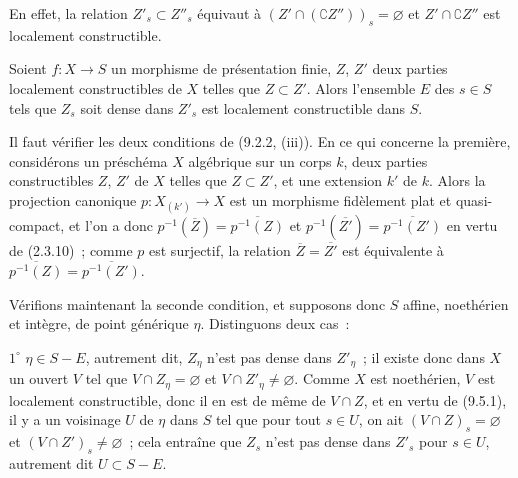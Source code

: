 En effet, la relation $Z'_s\subset Z''_s$ équivaut à
$(Z'\cap(\complement Z''))_s=\varnothing$ et
$Z'\cap\complement Z''$ est localement constructible.

\begin{proposition}[9.5.3]
\label{IV.9.5.3-fr}
Soient $f:X\to S$ un morphisme de présentation finie, $Z$, $Z'$ deux parties
localement constructibles de $X$ telles que $Z\subset Z'$. Alors l'ensemble
$E$ des $s\in S$ tels que $Z_s$ soit dense dans $Z'_s$ est localement
constructible dans $S$.
\end{proposition}

Il faut vérifier les deux conditions de (9.2.2, (iii)). En ce qui concerne la
première, considérons un préschéma $X$ algébrique sur un corps $k$, deux parties
constructibles $Z$, $Z'$ de $X$ telles que $Z\subset Z'$, et une extension
$k'$ de $k$. Alors la projection canonique $p:X_{(k')}\to X$ est un morphisme
fidèlement plat et quasi-compact, et l'on a donc
$p^{-1}(\overline Z)=\overline{p^{-1}(Z)}$ et
$p^{-1}(\overline{Z'})=\overline{p^{-1}(Z')}$ en vertu de (2.3.10)~; comme
$p$ est surjectif, la relation $\overline Z=\overline{Z'}$ est équivalente à
$\overline{p^{-1}(Z)}=\overline{p^{-1}(Z')}$.

Vérifions maintenant la seconde condition, et supposons donc $S$ affine,
noethérien et intègre, de point générique $\eta$. Distinguons deux cas~:

$1^\circ$ $\eta\in S-E$, autrement dit, $Z_\eta$ n'est pas dense dans
$Z'_\eta$~; il existe donc dans $X$ un ouvert $V$ tel que
$V\cap Z_\eta=\varnothing$ et $V\cap Z'_\eta\neq\varnothing$. Comme $X$ est
noethérien, $V$ est localement constructible, donc il en est de même de
$V\cap Z$, et en vertu de (9.5.1), il y a un voisinage $U$ de $\eta$ dans $S$
tel que pour tout $s\in U$, on ait $(V\cap Z)_s=\varnothing$ et
$(V\cap Z')_s\neq\varnothing$~; cela entraîne que $Z_s$ n'est pas dense dans
$Z'_s$ pour $s\in U$, autrement dit $U\subset S-E$.

